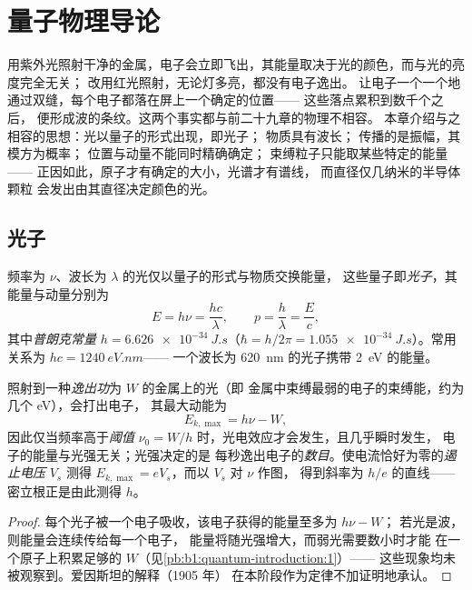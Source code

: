 \chapter{量子物理导论}\label{ch:b1:quantum-introduction}

用紫外光照射干净的金属，电子会立即飞出，其能量取决于光的颜色，而与光的亮度完全无关；
改用红光照射，无论灯多亮，都没有电子逸出。
让电子一个一个地通过双缝，每个电子都落在屏上一个确定的位置——
这些落点累积到数千个之后，
便形成波的条纹。这两个事实都与前二十九章的物理不相容。
本章介绍与之相容的思想：光以量子的形式出现，即光子；
物质具有波长；
传播的是振幅，其模方为概率；
位置与动量不能同时精确确定；
束缚粒子只能取某些特定的能量——
正因如此，原子才有确定的大小，光谱才有谱线，
而直径仅几纳米的半导体颗粒
会发出由其直径决定颜色的光。

\section{光子}

\begin{theorem}\label{thm:b1:quantum-introduction:photon}
频率为 $\nu$、波长为 $\lambda$ 的光仅以量子的形式与物质交换能量，
这些量子即\emph{光子}，其能量与动量分别为
\[
E = h\nu = \frac{hc}{\lambda} , \qquad p = \frac{h}{\lambda} = \frac{E}{c} ,
\]
其中\emph{普朗克常量} $h = \qty{6.626e-34}{J.s}$（$\hbar = h/2\pi =
\qty{1.055e-34}{J.s}$）。常用关系为 $hc = \qty{1240}{eV.nm}$——
一个波长为 \qty{620}{nm} 的光子携带 \qty{2}{eV} 的能量。
\end{theorem}
\admitted

\begin{proposition}[光电效应]\label{prop:b1:quantum-introduction:photoelectric}
照射到一种\emph{逸出功}为 $W$ 的金属上的光（即
金属中束缚最弱的电子的束缚能，约为几个 eV），会打出电子，
其最大动能为
\[
E_{k,\max} = h\nu - W ,
\]
因此仅当频率高于\emph{阈值} $\nu_0 = W/h$ 时，光电效应才会发生，且几乎瞬时发生，
电子的能量与光强无关；光强决定的是
每秒逸出电子的\emph{数目}。使电流恰好为零的\emph{遏止电压}
$V_s$ 测得 $E_{k,\max} = eV_s$，而以 $V_s$ 对 $\nu$ 作图，
得到斜率为 $h/e$ 的直线——
密立根正是由此测得 $h$。
\end{proposition}

\begin{proof}
每个光子被一个电子吸收，该电子获得的能量至多为 $h\nu - W$；
若光是波，则能量会连续传给每一个电子，
能量将随光强增大，而弱光需要数小时才能
在一个原子上积累足够的 $W$（见\cref{pb:b1:quantum-introduction:1}）——
这些现象均未被观察到。爱因斯坦的解释（1905 年）
在本阶段作为定律不加证明地承认。
\end{proof}

